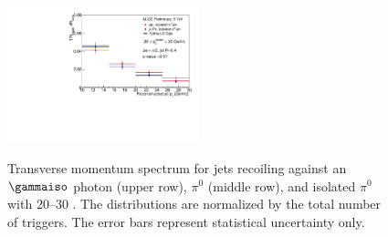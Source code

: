 \begin{figure}[h]
\includegraphics[width=0.495\textwidth]{GammaJet/FinalResult_IsoPionjetpt_R0_4}\\
\caption{Transverse momentum spectrum for jets recoiling against an $\gammaiso$ photon (upper row), $\pi^{0}$ (middle row), and isolated $\pi^{0}$ with 20--30 \GeVc. The distributions are normalized by the total number of triggers. The error bars represent statistical uncertainty only.}
\label{fig:FinalResults_RecoLevel}
\end{figure}


